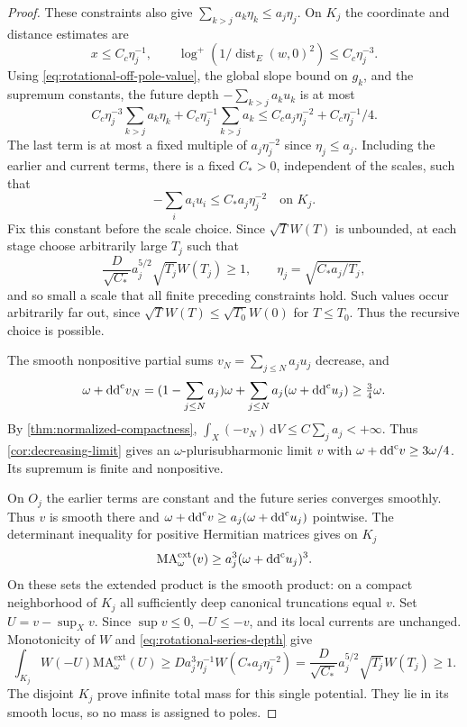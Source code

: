\begin{proof}
These constraints also give $\sum_{k>j}a_k\eta_k\leq a_j\eta_j$.
On $K_j$ the coordinate and distance estimates are
\[
 x\leq C_c\eta_j^{-1},\qquad
 \log^+(1/\operatorname{dist}_E(w,0)^2)\leq C_c\eta_j^{-3}.
\]
Using \eqref{eq:rotational-off-pole-value}, the global slope bound on $g_k$, and the
supremum constants, the future depth $-\sum_{k>j}a_ku_k$ is at most
\[
 C_c\eta_j^{-3}\sum_{k>j}a_k\eta_k
       +C_c\eta_j^{-1}\sum_{k>j}a_k
 \leq C_c a_j\eta_j^{-2}+C_c\eta_j^{-1}/4.
\]
The last term is at most a fixed multiple of $a_j\eta_j^{-2}$ since
$\eta_j\leq a_j$. Including the earlier and current terms, there is a fixed
$C_*>0$, independent of the scales, such that
\begin{equation}\label{eq:rotational-series-depth}
 -\sum_i a_iu_i\leq C_*a_j\eta_j^{-2}\quad\text{on }K_j.
\end{equation}
Fix this constant before the scale choice. Since $\sqrt T W(T)$ is unbounded,
at each stage choose arbitrarily large $T_j$ such that
\[
 \frac D{\sqrt{C_*}}a_j^{5/2}\sqrt{T_j}W(T_j)\geq1,
 \qquad \eta_j=\sqrt{C_*a_j/T_j},
\]
and so small a scale that all finite preceding constraints hold.
Such values occur arbitrarily far out, since $\sqrt TW(T)\leq\sqrt{T_0}W(0)$
for $T\leq T_0$. Thus the recursive choice is possible.

The smooth nonpositive partial sums $v_N=\sum_{j\leq N}a_ju_j$ decrease, and
\[
 \omega+\mathrm{dd}^{\mathrm{c}} v_N
 =(1-\sum_{j\leq N}a_j)\omega
       +\sum_{j\leq N}a_j(\omega+\mathrm{dd}^{\mathrm{c}} u_j)\geq\tfrac34\omega.
\]
By \cref{thm:normalized-compactness}, $\int_X(-v_N)\,\mathrm dV\leq C\sum_j a_j<+\infty$. Thus \cref{cor:decreasing-limit} gives an $\omega$-plurisubharmonic limit $v$ with $\omega+\mathrm{dd}^{\mathrm{c}} v\geq3\omega/4$. Its supremum is finite and nonpositive.

On $O_j$ the earlier terms are constant and the future series converges
smoothly. Thus $v$ is smooth there and
$\omega+\mathrm{dd}^{\mathrm{c}} v\geq a_j(\omega+\mathrm{dd}^{\mathrm{c}} u_j)$ pointwise.
The determinant inequality for positive Hermitian matrices gives on $K_j$
\[
 \mathrm{MA}^{\mathrm{ext}}_\omega(v)\geq a_j^3(\omega+\mathrm{dd}^{\mathrm{c}} u_j)^3.
\]
On these sets the extended product is the smooth product: on a compact neighborhood of $K_j$
all sufficiently deep canonical truncations equal $v$.
Set $U=v-\sup_Xv$. Since $\sup v\leq0$, $-U\leq-v$, and its local currents
are unchanged. Monotonicity of $W$ and \eqref{eq:rotational-series-depth} give
\[
 \int_{K_j}W(-U)\mathrm{MA}^{\mathrm{ext}}_\omega(U)
 \geq D a_j^3\eta_j^{-1}W(C_*a_j\eta_j^{-2})
 =\frac D{\sqrt{C_*}}a_j^{5/2}\sqrt{T_j}W(T_j)\geq1.
\]
The disjoint $K_j$ prove infinite total mass for this single potential.
They lie in its smooth locus, so no mass is assigned to poles.
\end{proof}

